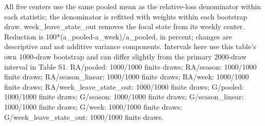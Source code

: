\begin{table}[htbp]
\begin{tabularx}{\linewidth}
\bottomrule
\end{tabularx}
\par\smallskip
\begin{minipage}{\linewidth}\footnotesize\raggedright
All five centers use the same pooled mean as the relative-loss denominator within each statistic; the denominator is refitted with weights within each bootstrap draw. week\_\allowbreak{}leave\_\allowbreak{}state\_\allowbreak{}out removes the focal state from its weekly center. Reduction is 100*(a\_\allowbreak{}pooled-a\_\allowbreak{}week)/a\_\allowbreak{}pooled, in percent; changes are descriptive and not additive variance components. Intervals here use this table's own 1000-draw bootstrap and can differ slightly from the primary 2000-draw interval in Table S1. RA/pooled: 1000/1000 finite draws; RA/season: 1000/1000 finite draws; RA/season\_\allowbreak{}linear: 1000/1000 finite draws; RA/week: 1000/1000 finite draws; RA/week\_\allowbreak{}leave\_\allowbreak{}state\_\allowbreak{}out: 1000/1000 finite draws; G/pooled: 1000/1000 finite draws; G/season: 1000/1000 finite draws; G/season\_\allowbreak{}linear: 1000/1000 finite draws; G/week: 1000/1000 finite draws; G/week\_\allowbreak{}leave\_\allowbreak{}state\_\allowbreak{}out: 1000/1000 finite draws.
\end{minipage}
\end{table}
